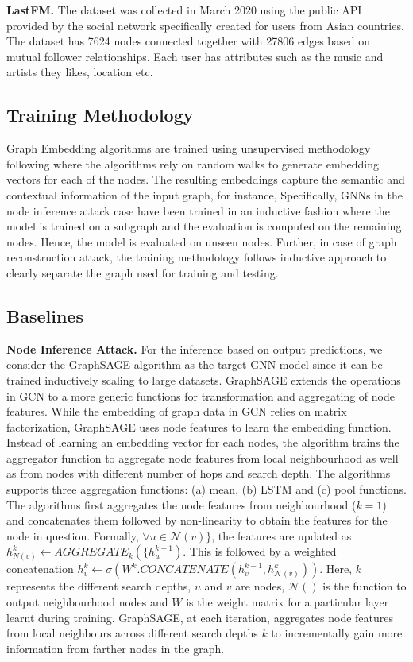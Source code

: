 \noindent\textbf{LastFM.} The dataset was collected in March 2020 using the public API provided by the social network specifically created for users from Asian countries.
The dataset has 7624 nodes connected together with 27806 edges based on mutual follower relationships.
Each user has attributes such as the music and artists they likes, location etc.


\subsection{Training Methodology}

Graph Embedding algorithms are trained using unsupervised methodology following where the algorithms rely on random walks to generate embedding vectors for each of the nodes.
The resulting embeddings capture the semantic and contextual information of the input graph, for instance,
Specifically, GNNs in the node inference attack case have been trained in an inductive fashion where the model is trained on a subgraph and the evaluation is computed on the remaining nodes.
Hence, the model is evaluated on unseen nodes.
Further, in case of graph reconstruction attack, the training methodology follows inductive approach to clearly separate the graph used for training and testing.


\subsection{Baselines}

\noindent\textbf{Node Inference Attack.} For the inference based on output predictions, we consider the GraphSAGE algorithm as the target GNN model since it can be trained inductively scaling to large datasets.
GraphSAGE extends the operations in GCN to a more generic functions for transformation and aggregating of node features.
While the embedding of graph data in GCN relies on matrix factorization, GraphSAGE uses node features to learn the embedding function.
Instead of learning an embedding vector for each nodes, the algorithm trains the aggregator function to aggregate node features from local neighbourhood as well as from nodes with different number of hops and search depth.
The algorithms supports three aggregation functions: (a) mean, (b) LSTM and (c) pool functions. The algorithms first aggregates the node features from neighbourhood ($k=1$) and concatenates them followed by non-linearity to obtain the features for the node in question.
Formally, $\forall u \in \mathcal{N}(v)\}$, the features are updated as $h^{k}_{N(v)} \leftarrow AGGREGATE_k(\{h^{k-1}_u)$.
This is followed by a weighted concatenation $h^{k}_v \leftarrow \sigma(W^k.CONCATENATE(h^{k-1}_v, h^{k}_{\mathcal{N}(v)}))$.
Here, $k$ represents the different search depths, $u$ and $v$ are nodes, $\mathcal{N}()$ is the function to output neighbourhood nodes and $W$ is the weight matrix for a particular layer learnt during training.
GraphSAGE, at each iteration, aggregates node features from local neighbours across different search depths $k$ to incrementally gain more information from farther nodes in the graph.


